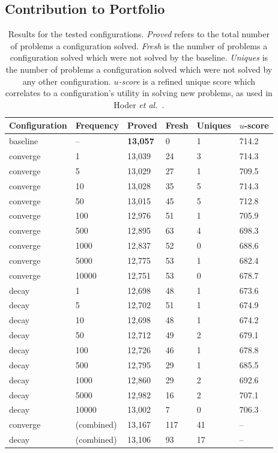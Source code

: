 \documentclass{llncs}
\begin{document}
\subsection{Contribution to Portfolio}

\begin{table}[t]
	\caption{
Results for the tested configurations.
\emph{Proved} refers to the total number of problems a configuration solved.
\emph{Fresh} is the number of problems a configuration solved which were not solved by the baseline.
\emph{Uniques} is the number of problems a configuration solved which were not solved by any other configuration.
\emph{\(u\)-score} is a refined unique score which correlates to a configuration's utility in solving new problems, as used in Hoder \emph{et al.}~\cite{u-score}.
	}
	\centering
	\begin{tabular}{l l l l l l}
		Configuration & Frequency & Proved & Fresh & Uniques & \(u\)-score\\
		\hline
		baseline & -- & \textbf{13,057} & 0 & 1 & 714.2\\ \hline
		converge & 1 & 13,039 & 24 & 3 & 714.3\\
		converge & 5 & 13,029 & 27 & 1 & 709.5\\
		converge & 10 & 13,028 & 35 & 5 & 714.3\\
		converge & 50 & 13,015 & 45 & 5 & 712.8\\
		converge & 100 & 12,976 & 51 & 1 & 705.9\\
		converge & 500 & 12,895 & 63 & 4 & 698.3\\
		converge & 1000 & 12,837 & 52 & 0 & 688.6\\
		converge & 5000 & 12,775 & 53 & 1 & 682.4\\
		converge & 10000 & 12,751 & 53 & 0 & 678.7\\ \hline
		decay & 1 & 12,698 & 48 & 1 & 673.6\\
		decay & 5 & 12,702 & 51 & 1 & 674.9\\
		decay & 10 & 12,698 & 48 & 1 & 674.2\\
		decay & 50 & 12,712 & 49 & 2 & 679.1\\
		decay & 100 & 12,726 & 46 & 1 & 678.8\\
		decay & 500 & 12,795 & 29 & 1 & 685.5\\
		decay & 1000 & 12,860 & 29 & 2 & 692.6\\
		decay & 5000 & 12,982 & 16 & 2 & 707.1\\
		decay & 10000 & 13,002 & 7 & 0 & 706.3\\
		\hline
		converge & (combined) & 13,167 & 117 & 41 & --\\
		decay & (combined) & 13,106 & 93 & 17 & --\\
	\end{tabular}
	\label{tab:results}
\end{table}
\end{document}
